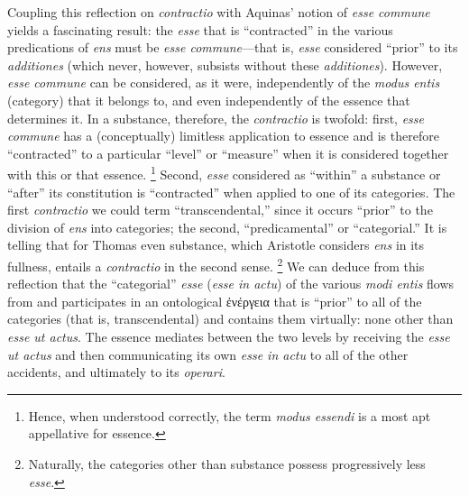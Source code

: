 Coupling this reflection on \emph{contractio} with Aquinas’ notion of \emph{esse commune} yields a fascinating result: the \emph{esse} that is “contracted” in the various predications of \emph{ens} must be \emph{esse commune}—that is, \emph{esse} considered “prior” to its \emph{additiones} (which never, however, subsists without these \emph{additiones}). However, \emph{esse commune} can be considered, as it were, independently of the \emph{modus entis} (category) that it belongs to, and even independently of the essence that determines it. In a substance, therefore, the \emph{contractio} is twofold: first, \emph{esse commune} has a (conceptually) limitless application to essence and is therefore “contracted” to a particular “level” or “measure” when it is considered together with this or that essence.%
%
\footnote{Hence, when understood correctly, the term \emph{modus essendi} is a most apt appellative for essence.}
%
Second, \emph{esse} considered as “within” a substance or “after” its constitution is “contracted” when applied to one of its categories. The first \emph{contractio} we could term “transcendental,” since it occurs “prior” to the division of \emph{ens} into categories; the second, “predicamental” or “categorial.” It is telling that for Thomas even substance, which Aristotle considers \emph{ens} in its fullness, entails a \emph{contractio} in the second sense.%
%
\footnote{Naturally, the categories other than substance possess progressively less \emph{esse}.}
%
We can deduce from this reflection that the “categorial” \emph{esse} (\emph{esse in actu}) of the various \emph{modi entis} flows from and participates in an ontological ἐνέργεια that is “prior” to all of the categories (that is, transcendental) and contains them virtually: none other than \emph{esse ut actus}. The essence mediates between the two levels by receiving the \emph{esse ut actus} and then communicating its own \emph{esse in actu} to all of the other accidents, and ultimately to its \emph{operari}.

